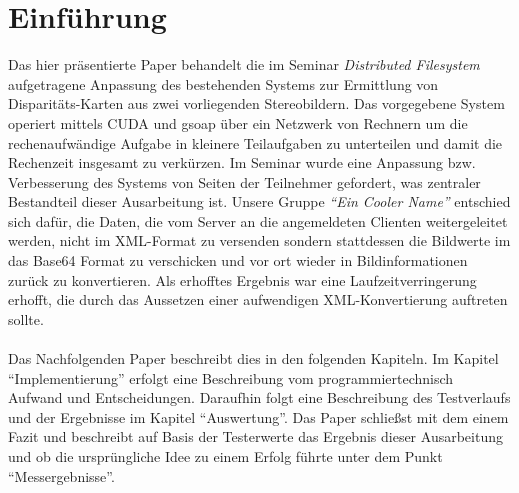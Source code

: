 \section{Einf\"uhrung}

Das hier pr\"asentierte Paper behandelt die im Seminar {\it Distributed Filesystem} aufgetragene Anpassung des bestehenden Systems zur Ermittlung von Disparit\"ats-Karten aus zwei vorliegenden Stereobildern. Das vorgegebene System operiert mittels CUDA und gsoap \"uber ein Netzwerk von Rechnern um die rechenaufw\"andige Aufgabe in kleinere Teilaufgaben zu unterteilen und damit die Rechenzeit insgesamt zu verk\"urzen.
Im Seminar wurde eine Anpassung bzw. Verbesserung des Systems von Seiten der Teilnehmer gefordert, was zentraler Bestandteil dieser Ausarbeitung ist. Unsere Gruppe {\it ``Ein Cooler Name''} entschied sich daf\"ur, die Daten, die vom Server an die angemeldeten Clienten weitergeleitet werden, nicht im XML-Format zu versenden sondern stattdessen die Bildwerte im das Base64 Format zu verschicken und vor ort wieder in Bildinformationen zur\"uck zu konvertieren. Als erhofftes Ergebnis war eine Laufzeitverringerung erhofft, die durch das Aussetzen einer aufwendigen XML-Konvertierung auftreten sollte.\\\\
Das Nachfolgenden Paper beschreibt dies in den folgenden Kapiteln. Im Kapitel ``Implementierung'' erfolgt eine Beschreibung vom programmiertechnisch Aufwand und Entscheidungen. Daraufhin folgt eine Beschreibung des Testverlaufs und der Ergebnisse im Kapitel ``Auswertung''. Das Paper schlie{\ss}st mit dem einem Fazit und beschreibt auf Basis der Testerwerte das Ergebnis dieser Ausarbeitung und ob die urspr\"ungliche Idee zu einem Erfolg f\"uhrte unter dem Punkt ``Messergebnisse''.